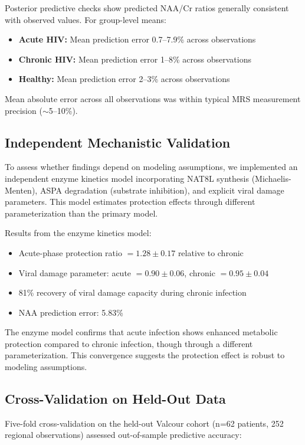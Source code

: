 \documentclass[10pt,a4paper]{article}
\begin{document}
Posterior predictive checks show predicted NAA/Cr ratios generally consistent with observed values. For group-level means:

\begin{itemize}
\item \textbf{Acute HIV:} Mean prediction error 0.7--7.9\% across observations
\item \textbf{Chronic HIV:} Mean prediction error 1--8\% across observations
\item \textbf{Healthy:} Mean prediction error 2--3\% across observations
\end{itemize}

Mean absolute error across all observations was within typical MRS measurement precision ($\sim$5--10\%).

\subsection{Independent Mechanistic Validation}

To assess whether findings depend on modeling assumptions, we implemented an independent enzyme kinetics model incorporating NAT8L synthesis (Michaelis-Menten), ASPA degradation (substrate inhibition), and explicit viral damage parameters. This model estimates protection effects through different parameterization than the primary model.

Results from the enzyme kinetics model:
\begin{itemize}
\item Acute-phase protection ratio $= 1.28 \pm 0.17$ relative to chronic
\item Viral damage parameter: acute $= 0.90 \pm 0.06$, chronic $= 0.95 \pm 0.04$
\item 81\% recovery of viral damage capacity during chronic infection
\item NAA prediction error: 5.83\%
\end{itemize}

The enzyme model confirms that acute infection shows enhanced metabolic protection compared to chronic infection, though through a different parameterization. This convergence suggests the protection effect is robust to modeling assumptions.

\subsection{Cross-Validation on Held-Out Data}

Five-fold cross-validation on the held-out Valcour cohort (n=62 patients, 252 regional observations) assessed out-of-sample predictive accuracy:
\end{document}
